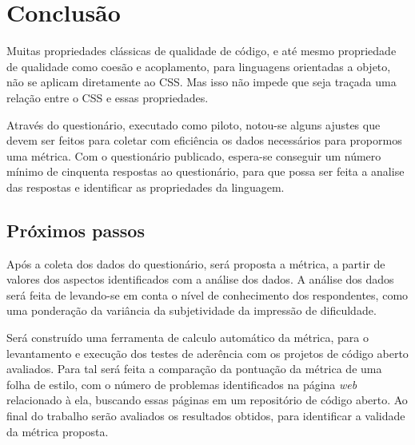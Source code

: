 %
%

\chapter{Conclusão}

Muitas propriedades clássicas de qualidade de código, e até mesmo propriedade de qualidade como coesão e acoplamento, para linguagens orientadas a objeto, não se aplicam diretamente ao CSS. Mas isso não impede que seja traçada uma relação entre o CSS e essas propriedades.

Através do questionário, executado como piloto, notou-se alguns ajustes que devem ser feitos para coletar com eficiência os dados necessários para propormos uma métrica. Com o questionário publicado, espera-se conseguir um número mínimo de cinquenta respostas ao questionário, para que possa ser feita a analise das respostas e identificar as propriedades da linguagem.

\section{Próximos passos}

Após a coleta dos dados do questionário, será proposta a métrica, a partir de valores dos aspectos identificados com a análise dos dados. A análise dos dados será feita de levando-se em conta o nível de conhecimento dos respondentes, como uma ponderação da variância da subjetividade da impressão de dificuldade.

Será construído uma ferramenta de calculo automático da métrica, para o levantamento e execução dos testes de aderência com os projetos de código aberto avaliados. Para tal será feita a comparação da pontuação da métrica de uma folha de estilo, com o número de problemas identificados na página \textit{web} relacionado à ela, buscando essas páginas em um repositório de código aberto. Ao final do trabalho serão avaliados os resultados obtidos, para identificar a validade da métrica proposta.